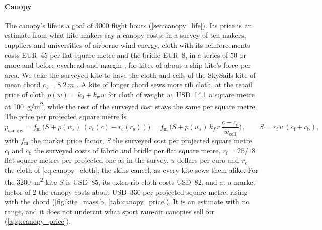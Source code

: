 \paragraph{Canopy} The canopy's life is a goal of \num{3000} flight hours (\cref{sec:canopy_life}). Its price is an estimate from what kite makers say a canopy costs: in a survey of ten makers, suppliers and universities of airborne wind energy, cloth with its reinforcements costs EUR~45 per flat square metre and the bridle EUR~8, in a series of 50 or more and before overhead and margin \citep{joshi2024refeconomic}, for kites of about a ship kite's force per area. We take the surveyed kite to have the cloth and cells of the SkySails kite of mean chord $c_\mathrm{s}=\SI{8.2}{m}$ \citep{folkersma2020}. A kite of longer chord sews more rib cloth, at the retail price of cloth $p(w)=k_0+k_\mathrm{w}w$ for cloth of weight $w$, USD~14.1 a square metre at \SI{100}{g/m^2}, while the rest of the surveyed cost stays the same per square metre. The price per projected square metre is
\begin{equation}
p_\mathrm{canopy} = f_\mathrm{m}\,\big(S + p(w_\mathrm{s})\,(r_\mathrm{c}(c) - r_\mathrm{c}(c_\mathrm{s}))\big) = f_\mathrm{m}\,\Big(S + p(w_\mathrm{s})\,k_f\,r\,\frac{c - c_\mathrm{s}}{w_\mathrm{cell}}\Big), \qquad S = r_\mathrm{f}\,u\,(c_\mathrm{f} + c_\mathrm{b}),
\label{eq:canopy_price}
\end{equation}
with $f_\mathrm{m}$ the market price factor, $S$ the surveyed cost per projected square metre, $c_\mathrm{f}$ and $c_\mathrm{b}$ the surveyed costs of fabric and bridle per flat square metre, $r_\mathrm{f}=25/18$ flat square metres per projected one as in the survey, $u$ dollars per euro and $r_\mathrm{c}$ the cloth of \cref{eq:canopy_cloth}; the skins cancel, as every kite sews them alike. For the \SI{3200}{m^2} kite $S$ is USD~85, its extra rib cloth costs USD~82, and at a market factor of 2 the canopy costs about USD~330 per projected square metre, rising with the chord (\cref{fig:kite_mass}b, \cref{tab:canopy_price}). It is an estimate with no range, and it does not undercut what sport ram-air canopies sell for (\cref{app:canopy_price}).


